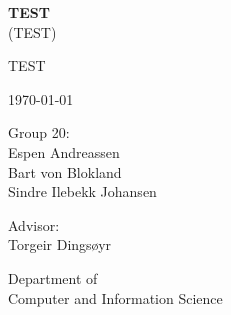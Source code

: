 \documentclass[12pt,a4paper,oneside]{report}
\begin{document}

\thispagestyle{empty}

\begin{center}
    {\Huge\textbf{TEST}} \\
    \medskip
    {\huge (TEST)}

    \vspace{.5cm}

    {\Large
    TEST}\\

    \vspace{0.5cm}

    {\large \today}\\

    \vspace{0.5cm}

    {\Large Group 20:}\\
    {\large
    Espen Andreassen\\
    Bart von Blokland\\
    Sindre Ilebekk Johansen\\
    }

    \vspace{0.5cm}

    {\large
    Advisor:\\
    Torgeir Dingsøyr\\}

    \vspace{1cm}



    \large{Department of\\Computer and Information Science}

\end{center}

\newpage

\setcounter{tocdepth}{1}
\dominitoc
\dominilof
\dominilot
\tableofcontents
\clearpage
\listoffigures
\listoftables



%
\end{document}
